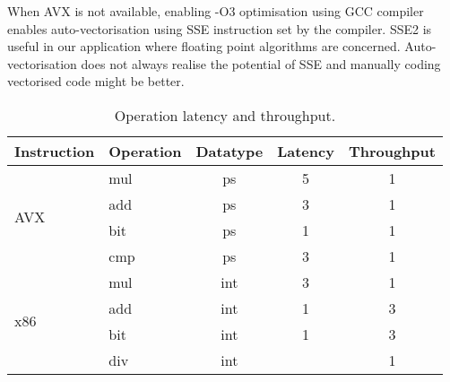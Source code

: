 \documentclass[journal]{IEEEtran}
\begin{document}
When AVX is not available, enabling -O3 optimisation using GCC compiler enables auto-vectorisation using SSE instruction set by the compiler. SSE2 is useful in our application where floating point algorithms are concerned. Auto-vectorisation does not always realise the potential of SSE and manually coding vectorised code might be better. \\

\begin{table}[h]
\centering

\begin{tabular}{l l c c c}
\hline
Instruction & Operation & Datatype & Latency & Throughput \\
\hline \hline
\multirow{4}{*}{AVX}
 & mul & ps 	& 5 	& 1 \\
 & add & ps 	& 3 	& 1 \\
 & bit & ps 	& 1 	& 1 \\
 & cmp & ps 	& 3 	& 1 \\
\hline

\multirow{4}{*}{x86}
 & mul & int 	& 3 	& 1 \\
 & add & int	& 1 	& 3 \\
 & bit & int 	& 1 	& 3 \\
 & div & int 	& \texttildelow 21 	& 1 \\
\hline

\end{tabular}
\caption{Operation latency and throughput.}\label{ops}
\end{table}
\end{document}
